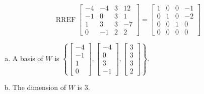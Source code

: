\begin{exerciseAnswer} 


\[\operatorname{RREF} \left[\begin{array}{cccc}
-4 & -4 & 3 & 12 \\
-1 & 0 & 3 & 1 \\
1 & 3 & 3 & -7 \\
0 & -1 & 2 & 2
\end{array}\right] = \left[\begin{array}{cccc}
1 & 0 & 0 & -1 \\
0 & 1 & 0 & -2 \\
0 & 0 & 1 & 0 \\
0 & 0 & 0 & 0
\end{array}\right] \]


\begin{enumerate}[(a)]
\item A basis of \(W\) is \( \left\{ \left[\begin{array}{c}
-4 \\
-1 \\
1 \\
0
\end{array}\right] , \left[\begin{array}{c}
-4 \\
0 \\
3 \\
-1
\end{array}\right] , \left[\begin{array}{c}
3 \\
3 \\
3 \\
2
\end{array}\right] \right\} \).
\item The dimension of \(W\) is \( 3 \).
\end{enumerate}
    
\end{exerciseAnswer}
    
